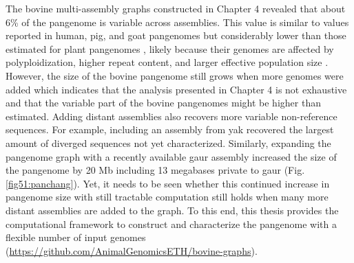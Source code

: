 \documentclass[../main.tex]{subfiles}
\begin{document}
The bovine multi-assembly graphs constructed in Chapter 4 revealed that about 6\% of the pangenome is variable across assemblies. This value is similar to values reported in human, pig, and goat pangenomes \citep{li2017comprehensive,li2019towards,duan2019hupan} but considerably lower than those estimated for plant pangenomes \citep{golicz2016pangenome,gordon2017extensive,gao2019tomato}, likely because their genomes are affected by polyploidization, higher repeat content, and larger effective population size \citep{lei2021plant}. However, the size of the bovine pangenome still grows when more genomes were added which indicates that the analysis presented in Chapter 4 is not exhaustive and that the variable part of the bovine pangenomes might be higher than estimated. Adding  distant assemblies also recovers more variable non-reference sequences. For example, including an assembly from yak recovered the largest amount of diverged sequences not yet characterized. Similarly, expanding the pangenome graph with a recently available gaur assembly increased the size of the pangenome by 20 Mb including 13 megabases private to gaur (Fig. \ref{fig51:panchang}). Yet, it needs to be seen whether this continued increase in pangenome size with still tractable computation still holds when many more distant assemblies are added to the graph. To this end, this thesis provides the computational framework to construct and characterize the pangenome with a flexible number of input genomes (\url{https://github.com/AnimalGenomicsETH/bovine-graphs}). 
\end{document}
